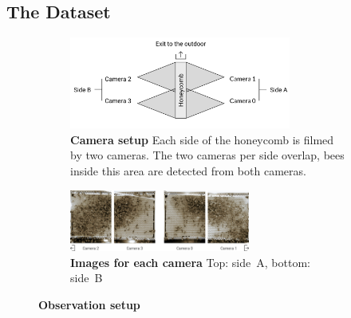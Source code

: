 \subsection{The Dataset}
\label{sec:dataset}

\begin{figure}
    \centering
    \begin{subfigure}[b]{\textwidth}
	\centering
	\includegraphics[width=0.8\textwidth]{Figures/setupCams}
	\caption[Camera setup]{\textbf{Camera setup} Each side of the honeycomb is filmed by two cameras. The two cameras per side overlap, bees inside this area are detected from both cameras.}
	\label{fig:cams}
	\vspace{5mm}
    \end{subfigure}
    \begin{subfigure}[b]{\textwidth}
	\centering
	\includegraphics[width=0.65\textwidth]{Figures/beesClose}
	\vspace{5mm}
	\caption[Images for each camera]{\textbf{Images for each camera} Top: side~A, bottom: side~B}
	\label{fig:veryclose}
    \end{subfigure}
 	\caption[Observation setup]{\textbf{Observation setup}}
 	\label{fig:obssetup}
\end{figure}

